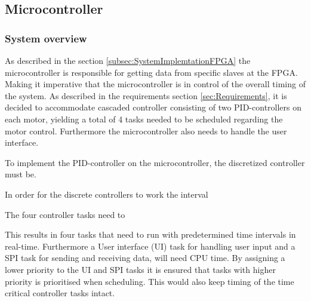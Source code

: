 \documentclass[../../main.tex]{subfiles}
\begin{document}
    



\subsection{Microcontroller} \label{subsec:SystemImplementationMicroController}

\subsubsection*{System overview}
\label{subsec:SystemImplementationOperatingSystem}

As described in the section \ref{subsec:SystemImplemtationFPGA} the microcontroller is responsible for getting data from specific slaves at the FPGA. Making it imperative that the microcontroller is in control of the overall timing of the system. As described in the requirements section \ref{sec:Requirements}, it is decided to accommodate cascaded controller consisting of two PID-controllers on each motor, yielding a total of 4 tasks needed to be scheduled regarding the motor control. Furthermore the microcontroller also needs to handle the user interface. 



To implement the PID-controller on the microcontroller, the discretized controller must be.

In order for the discrete controllers to work the interval 

The four controller tasks need to 



This results in four tasks that need to run with predetermined time intervals in real-time. Furthermore a User interface (UI) task for handling user input and a SPI task for sending and receiving data, will need CPU time. By assigning a lower priority to the UI and SPI tasks it is ensured that tasks with higher priority is prioritised when scheduling. This would also keep timing of the time critical controller tasks intact. 
\end{document}
